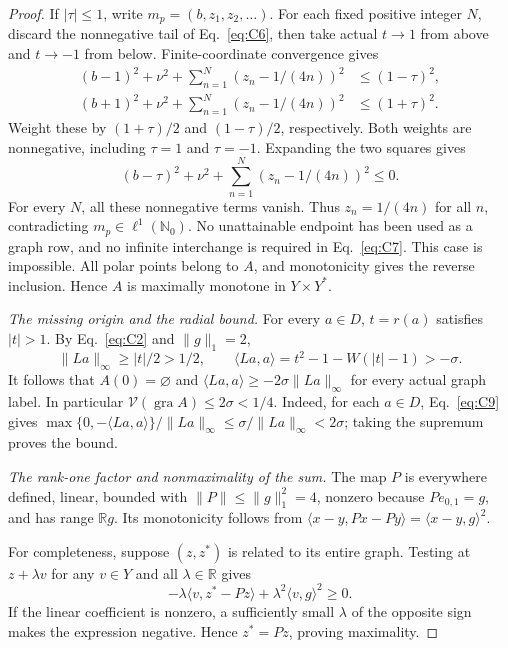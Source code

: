 \documentclass[11pt]{article}
\newcommand{\R}{\mathbb R}
\newcommand{\Nzero}{\mathbb N_0}
\newcommand{\gra}{\operatorname{gra}}
\newcommand{\pair}[2]{\langle #1,#2\rangle}
\begin{document}
\begin{proof}
If $|\tau|\le1$, write $m_p=(b,z_1,z_2,\ldots)$. For each fixed positive
integer $N$, discard the nonnegative tail of Eq.~\eqref{eq:C6}, then
take actual $t\to1$ from above and $t\to-1$ from below.
Finite-coordinate convergence gives
\begin{equation}
\begin{aligned}
(b-1)^2+\nu^2+\sum_{n=1}^N(z_n-1/(4n))^2&\le(1-\tau)^2,\\
(b+1)^2+\nu^2+\sum_{n=1}^N(z_n-1/(4n))^2&\le(1+\tau)^2.
\end{aligned}
\tag{C7}\label{eq:C7}
\end{equation}
Weight these by $(1+\tau)/2$ and $(1-\tau)/2$, respectively. Both
weights are nonnegative, including $\tau=1$ and $\tau=-1$. Expanding
the two squares gives
\begin{equation}
(b-\tau)^2+\nu^2+\sum_{n=1}^N(z_n-1/(4n))^2\le0.
\tag{C8}\label{eq:C8}
\end{equation}
For every $N$, all these nonnegative terms vanish. Thus $z_n=1/(4n)$ for
all $n$, contradicting $m_p\in\ell^1(\Nzero)$. No unattainable endpoint
has been used as a graph row, and no infinite interchange is required in
Eq.~\eqref{eq:C7}. This case is impossible. All polar points belong to
$A$, and monotonicity gives the reverse inclusion. Hence $A$ is maximally
monotone in $Y\times Y^*$.

\noindent\textit{The missing origin and the radial bound.}
\label{sec:C5}
For every $a\in D$, $t=r(a)$ satisfies $|t|>1$. By Eq.~\eqref{eq:C2}
and $\|g\|_1=2$,
\begin{equation}
\|La\|_\infty\ge|t|/2>1/2,\qquad
\pair{La}{a}=t^2-1-W(|t|-1)>-\sigma.
\tag{C9}\label{eq:C9}
\end{equation}
It follows that $A(0)=\varnothing$ and
$\pair{La}{a}\ge-2\sigma\|La\|_\infty$ for every actual graph label.
In particular $\mathcal V(\gra A)\le2\sigma<1/4$.
Indeed, for each $a\in D$, Eq.~\eqref{eq:C9} gives
$\max\{0,-\pair{La}{a}\}/\|La\|_\infty
\le\sigma/\|La\|_\infty<2\sigma$; taking the supremum proves the bound.

\noindent\textit{The rank-one factor and nonmaximality of the sum.}
\label{sec:C6}
The map $P$ is everywhere defined, linear, bounded with
$\|P\|\le\|g\|_1^2=4$, nonzero because $Pe_{0,1}=g$, and has range $\R g$.
Its monotonicity follows from $\pair{x-y}{Px-Py}=\pair{x-y}{g}^2$.

For completeness, suppose $(z,z^*)$ is related to its entire graph.
Testing at $z+\lambda v$ for any $v\in Y$ and all $\lambda\in\R$ gives
\begin{equation}
-\lambda\pair{v}{z^*-Pz}+\lambda^2\pair{v}{g}^2\ge0.
\tag{C10}\label{eq:C10}
\end{equation}
If the linear coefficient is nonzero, a sufficiently small $\lambda$ of
the opposite sign makes the expression negative. Hence $z^*=Pz$, proving maximality.


\end{proof}
\end{document}
